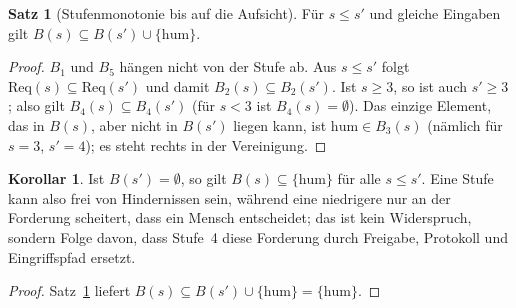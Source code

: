 \documentclass[a4paper,12pt]{article}
\theoremstyle{definition}
\newtheorem{satz}[definition]{Satz}
\newtheorem{korollar}[definition]{Korollar}
\begin{document}
\begin{satz}[Stufenmonotonie bis auf die Aufsicht]\label{thm:levels}
Für $s\le s'$ und gleiche Eingaben gilt $B(s)\subseteq B(s')\cup\{\mathrm{hum}\}$.
\end{satz}
\begin{proof}
$B_1$ und $B_5$ hängen nicht von der Stufe ab. Aus $s\le s'$ folgt $\mathrm{Req}(s)\subseteq\mathrm{Req}(s')$ und damit $B_2(s)\subseteq B_2(s')$. Ist $s\ge 3$, so ist auch $s'\ge 3$; also gilt $B_4(s)\subseteq B_4(s')$ (für $s<3$ ist $B_4(s)=\emptyset$). Das einzige Element, das in $B(s)$, aber nicht in $B(s')$ liegen kann, ist $\mathrm{hum}\in B_3(s)$ (nämlich für $s=3$, $s'=4$); es steht rechts in der Vereinigung.
\end{proof}

\begin{korollar}\label{cor:levels}
Ist $B(s')=\emptyset$, so gilt $B(s)\subseteq\{\mathrm{hum}\}$ für alle $s\le s'$. Eine Stufe kann also frei von Hindernissen sein, während eine niedrigere nur an der Forderung scheitert, dass ein Mensch entscheidet; das ist kein Widerspruch, sondern Folge davon, dass Stufe~4 diese Forderung durch Freigabe, Protokoll und Eingriffspfad ersetzt.
\end{korollar}
\begin{proof}
Satz~\ref{thm:levels} liefert $B(s)\subseteq B(s')\cup\{\mathrm{hum}\}=\{\mathrm{hum}\}$.
\end{proof}
\end{document}
